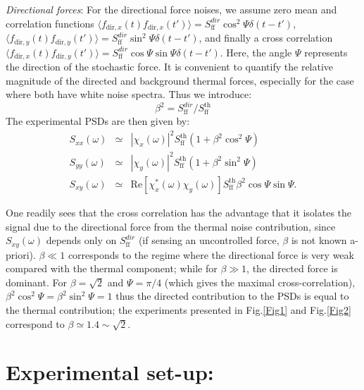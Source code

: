 \documentclass[twocolumn,english,notitlepage,superscriptaddress,nofootinbib]{revtex4-2}
\begin{document}
{\em Directional forces}: For the directional force noises,  we assume zero mean and correlation functions $\langle f_{\text{dir},x}(t)f_{\text{dir},x}(t')\rangle=S_{\text{ff}}^{dir} \cos^2 \Psi \delta(t-t')$, $\langle f_{\text{dir},y}(t)f_{\text{dir},y}(t')\rangle=S_{\text{ff}}^{dir} \sin^2\Psi \delta(t-t')$, and finally a cross correlation $\langle f_{\text{dir},x}(t)f_{\text{dir},y}(t')\rangle=S_{\text{ff}}^{dir} \cos\Psi\sin\Psi \delta(t-t')$. Here, the angle $\Psi$ represents the direction of the stochastic force.  It is convenient to quantify the relative magnitude of the directed and background thermal forces,  especially for the case where both have white noise spectra. Thus we introduce:
\begin{equation}\label{beta}
\beta^2 = S_{\text{ff}}^{dir}/S_{\text{ff}}^{\text{th}}
\end{equation}
The experimental PSDs are then given by:
\begin{eqnarray}
  S_{xx}(\omega) &\simeq &|\chi_x(\omega)|^2 S_{\text{ff}}^{\text{th}}(1+\beta^2\cos^2 \Psi) \nonumber\\
  S_{yy}(\omega) & \simeq &|\chi_y(\omega)|^2 S_{\text{ff}}^{\text{th}} (1+\beta^2\sin^2 \Psi)\nonumber \\
  S_{xy}(\omega) & \simeq &\text{Re}[\chi_x^*(\omega) \chi_y(\omega)] S_{\text{ff}}^{\text{th}}\beta^2\cos \Psi \sin \Psi.\label{PSDs}
\end{eqnarray}

One readily sees  that the cross correlation has the advantage that it isolates the signal due to the directional force from the thermal noise contribution,  since
 $S_{xy}(\omega)$  depends only on $S_{\text{ff}}^{dir}$ (if sensing an uncontrolled force, $\beta$ is not known a-priori).  
  $\beta \ll 1$ corresponds to the regime where the directional force is very weak compared with the thermal component;  while for $\beta \gg 1$,  the directed force is dominant.  For $\beta=\sqrt{2}$ and $\Psi=\pi/4$ (which gives the maximal cross-correlation),  $\beta^2\cos^2 \Psi=\beta^2\sin^2 \Psi=1$ thus the directed contribution to the PSDs  is equal to the thermal contribution; the experiments presented in Fig.\ref{Fig1} and Fig.\ref{Fig2} correspond to $\beta\simeq 1.4\sim \sqrt{2}$.



\section{ Experimental set-up:}
\end{document}
